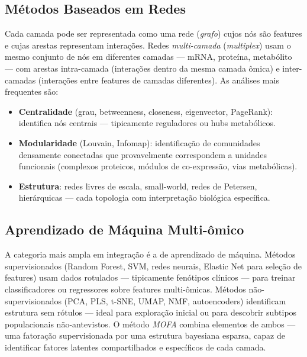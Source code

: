 \subsection{Métodos Baseados em Redes}
\label{sub:image11-redes}

Cada camada pode ser representada como uma rede (\emph{grafo}) cujos nós são
features e cujas arestas representam interações. Redes \emph{multi-camada}
(\emph{multiplex}) usam o mesmo conjunto de nós em diferentes camadas --- mRNA,
proteína, metabólito --- com arestas intra-camada (interações dentro da mesma
camada ômica) e inter-camadas (interações entre features de camadas diferentes).
As análises mais frequentes são:

\begin{itemize}
\item \textbf{Centralidade} (grau, betweenness, closeness, eigenvector,
  PageRank): identifica nós centrais --- tipicamente reguladores ou
  hubs metabólicos.
\item \textbf{Modularidade} (Louvain, Infomap): identificação de comunidades
  densamente conectadas que provavelmente correspondem a unidades
  funcionais (complexos proteicos, módulos de co-expressão, vias metabólicas).
\item \textbf{Estrutura}: redes livres de escala, small-world, redes de
  Petersen, hierárquicas --- cada topologia com interpretação
  biológica específica.
\end{itemize}

\subsection{Aprendizado de Máquina Multi-ômico}
\label{sub:image11-ml}

A categoria mais ampla em integração é a de aprendizado de máquina. Métodos
supervisionados (Random Forest, SVM, redes neurais, Elastic Net para seleção
de features) usam dados rotulados --- tipicamente fenótipos clínicos --- para
treinar classificadores ou regressores sobre features multi-ômicas.
Métodos não-supervisionados (PCA, PLS, t-SNE, UMAP, NMF, autoencoders)
identificam estrutura sem rótulos --- ideal para exploração inicial ou
para descobrir subtipos populacionais não-antevistos. O método \emph{MOFA}
combina elementos de ambos --- uma fatoração supervisionada por uma
estrutura bayesiana esparsa, capaz de identificar fatores latentes compartilhados
e específicos de cada camada.

